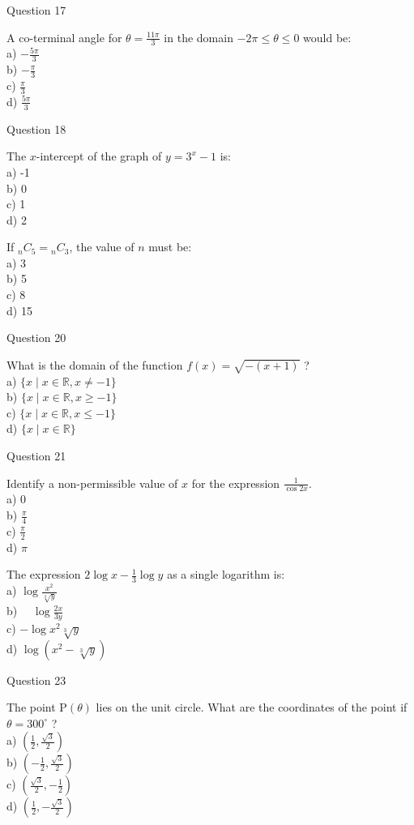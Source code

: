 \documentclass[10pt]{article}
\begin{document}
Question 17

A co-terminal angle for $\theta=\frac{11 \pi}{3}$ in the domain $-2 \pi \leq \theta \leq 0$ would be:\\
a) $-\frac{5 \pi}{3}$\\
b) $-\frac{\pi}{3}$\\
c) $\frac{\pi}{3}$\\
d) $\frac{5 \pi}{3}$

Question 18

The $x$-intercept of the graph of $y=3^{x}-1$ is:\\
a) -1\\
b) 0\\
c) 1\\
d) 2

If ${ }_{n} C_{5}={ }_{n} C_{3}$, the value of $n$ must be:\\
a) 3\\
b) 5\\
c) 8\\
d) 15

Question 20

What is the domain of the function $f(x)=\sqrt{-(x+1)}$ ?\\
a) $\{x \mid x \in \mathbb{R}, x \neq-1\}$\\
b) $\{x \mid x \in \mathbb{R}, x \geq-1\}$\\
c) $\{x \mid x \in \mathbb{R}, x \leq-1\}$\\
d) $\{x \mid x \in \mathbb{R}\}$

Question 21

Identify a non-permissible value of $x$ for the expression $\frac{1}{\cos 2 x}$.\\
a) 0\\
b) $\frac{\pi}{4}$\\
c) $\frac{\pi}{2}$\\
d) $\pi$

The expression $2 \log x-\frac{1}{3} \log y$ as a single logarithm is:\\
a) $\log \frac{x^{2}}{\sqrt[3]{y}}$\\
b) $\quad \log \frac{2 x}{3 y}$\\
c) $-\log x^{2} \sqrt[3]{y}$\\
d) $\log \left(x^{2}-\sqrt[3]{y}\right)$

Question 23

The point $\mathrm{P}(\theta)$ lies on the unit circle. What are the coordinates of the point if $\theta=300^{\circ}$ ?\\
a) $\left(\frac{1}{2}, \frac{\sqrt{3}}{2}\right)$\\
b) $\left(-\frac{1}{2}, \frac{\sqrt{3}}{2}\right)$\\
c) $\left(\frac{\sqrt{3}}{2},-\frac{1}{2}\right)$\\
d) $\left(\frac{1}{2},-\frac{\sqrt{3}}{2}\right)$
\end{document}
